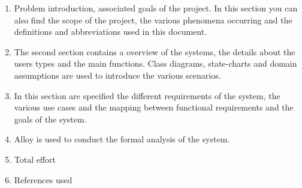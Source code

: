 \begin{enumerate}
	\item Problem introduction, associated goals of the project. In this section you can also find the scope of the project, the various phenomena occurring and the definitions and abbreviations used in this document.
	\item The second section contains a overview of the systems, the details about the users types and the main functions. Class diagrams, state-charts and domain assumptions are used to introduce the various scenarios.
	\item In this section are specified the different requirements of the system, the various use cases and the mapping between functional requirements and the goals of the system.
	\item Alloy is used to conduct the formal analysis of the system.
	\item Total effort
	\item References used
\end{enumerate}






















